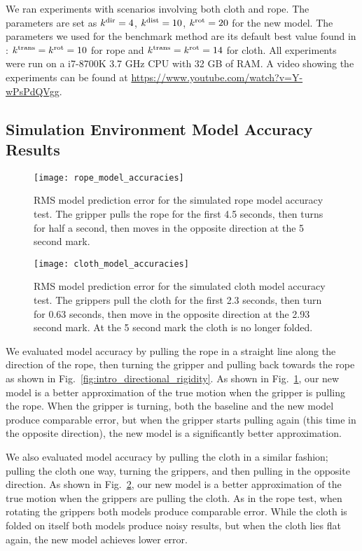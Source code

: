 We ran experiments with scenarios involving both cloth and rope. The parameters are set as $k^\textrm{dir} = 4$, $k^\textrm{dist} = 10$, $k^{\textrm{rot}} = 20$ for the new model. The parameters we used for the benchmark method are its default best value found in \cite{Berenson2013}: $k^{\textrm{trans}} = k^{\textrm{rot}} = 10$ for rope and $k^{\textrm{trans}} = k^{\textrm{rot}} = 14$ for cloth. All experiments were run on a i7-8700K 3.7 GHz CPU with 32 GB of RAM. A video showing the experiments can be found at \url{https://www.youtube.com/watch?v=Y-wPsPdQVgg}.

\subsection{Simulation Environment Model Accuracy Results}

\begin{figure}[ht]
    \centering
    \texttt{[image: rope\_model\_accuracies]}
    \caption{RMS model prediction error for the simulated rope model accuracy test. The gripper pulls the rope for the first 4.5 seconds, then turns for half a second, then moves in the opposite direction at the 5 second mark.}
    \label{fig:rope_model_accuracy_plot}
\end{figure}

\begin{figure}[ht]
    \centering
    \texttt{[image: cloth\_model\_accuracies]}
    \caption{RMS model prediction error for the simulated cloth model accuracy test. The grippers pull the cloth for the first 2.3 seconds, then turn for 0.63 seconds, then move in the opposite direction at the 2.93 second mark. At the 5 second mark the cloth is no longer folded. }
    \label{fig:cloth_model_accuracy_plot}
\end{figure}

We evaluated model accuracy by pulling the rope in a straight line along the direction of the rope, then turning the gripper and pulling back towards the rope as shown in Fig.~\ref{fig:intro_directional_rigidity}. As shown in Fig.~\ref{fig:rope_model_accuracy_plot}, our new model is a better approximation of the true motion when the gripper is pulling the rope. When the gripper is turning, both the baseline and the new model produce comparable error, but when the gripper starts pulling again (this time in the opposite direction), the new model is a significantly better approximation.

We also evaluated model accuracy by pulling the cloth in a similar fashion; pulling the cloth one way, turning the grippers, and then pulling in the opposite direction. As shown in Fig.~\ref{fig:cloth_model_accuracy_plot}, our new model is a better approximation of the true motion when the grippers are pulling the cloth. As in the rope test, when rotating the grippers both models produce comparable error. While the cloth is folded on itself both models produce noisy results, but when the cloth lies flat again, the new model achieves lower error.



